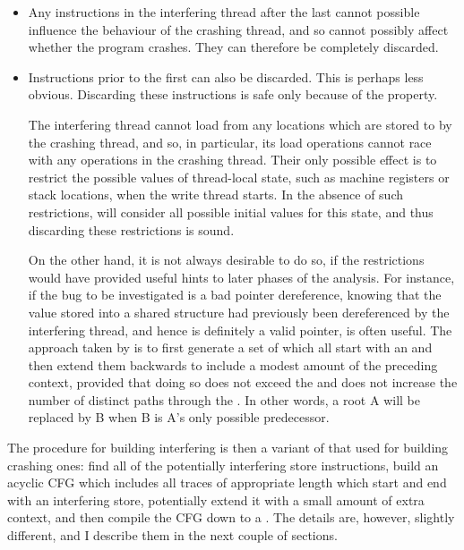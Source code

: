 \begin{itemize}
\item Any instructions in the interfering thread after the last
   cannot possible influence the behaviour
  of the crashing thread, and so cannot possibly affect whether the
  program crashes.  They can therefore be completely discarded.
\item Instructions prior to the first  can
  also be discarded.  This is perhaps less obvious.  Discarding these
  instructions is safe only because of the 
  property.


  The interfering thread cannot load from any locations which are
  stored to by the crashing thread, and so, in particular, its load
  operations cannot race with any operations in the crashing thread.
  Their only possible effect is to restrict the possible values of
  thread-local state, such as machine registers or stack locations,
  when the write thread starts.  In the absence of such restrictions,
  {\technique} will consider all possible initial values for this
  state, and thus discarding these restrictions is sound.

  On the other hand, it is not always desirable to do so, if the
  restrictions would have provided useful hints to later phases of the
  analysis.  For instance, if the bug to be investigated is a bad
  pointer dereference, knowing that the value stored into a shared
  structure had previously been dereferenced by the interfering
  thread, and hence is definitely a valid pointer, is often useful.
  The approach taken by {\implementation} is to first generate a set
  of  which all start with an  and then extend them backwards to include a modest amount
  of the preceding context, provided that doing so does not exceed the
   and does not increase the number of
  distinct paths through the .  In other words, a
   root A will be replaced by B when B is A's only
  possible predecessor.
\end{itemize}

The procedure for building interfering {\StateMachines} is then a
variant of that used for building crashing ones: find all of the
potentially interfering store instructions, build an acyclic CFG which
includes all traces of appropriate length which start and end with an
interfering store, potentially extend it with a small amount of extra
context, and then compile the CFG down to a {\StateMachine}.  The
details are, however, slightly different, and I describe them in the
next couple of sections.

